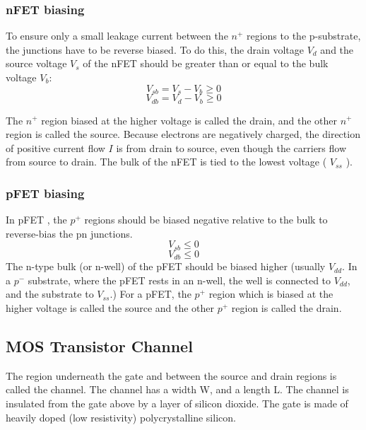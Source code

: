 \documentclass[main]{subfiles}
\begin{document}
\subsubsection{nFET biasing}
To ensure only a small leakage current between the $n^+$ regions to the p-substrate, the junctions have to be reverse biased.
To do this, the drain voltage $V_d$ and the source voltage $V_s$ of the nFET should be greater than or equal to the bulk voltage $V_b$:
\[V_{sb}=V_s-V_b \geq 0\]
\[V_{db}=V_d-V_b \geq 0\]


The $n^+$ region biased at the higher voltage is called the drain, and the other $n^+$ region is called the source. Because electrons are negatively charged, the direction of positive current flow $I$ is from drain to source, even though the carriers flow from source to drain. The bulk of the nFET is tied to the lowest voltage ( $V_{ss}$ ). \cite{book:VLSI}

\subsubsection{pFET biasing}
In pFET , the $p^+$ regions should be biased negative relative to the bulk to reverse-bias the pn junctions.
\[V_{sb} \leq 0\]
\[V_{db} \leq 0\]
The n-type bulk (or n-well) of the pFET should be biased higher (usually $V_{dd}$.  In a $p^-$ substrate, where the pFET rests in an n-well, the well is connected to $V_{dd}$, and the substrate to $V_{ss}$.) For a pFET, the $p^+$ region which is biased at the higher voltage is called the source and the other $p^+$ region is called the drain.


\subsection{MOS Transistor Channel}
The region underneath the gate and between the source and drain regions is called the channel. The channel has a width W, and a length L. The channel is insulated from the gate above by a layer of silicon dioxide. The gate is made of heavily doped (low resistivity) polycrystalline silicon.
\cite{book:VLSI}
\end{document}
